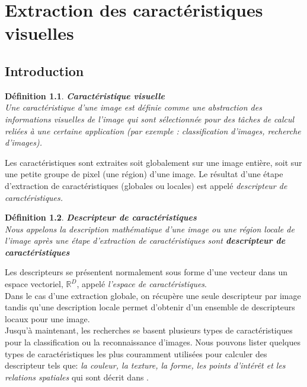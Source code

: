 \chapter[Extraction des caractéristiques]{Extraction des caractéristiques visuelles}
\label{chap:sift}

\section{Introduction}
\newtheorem{mydef}{Définition}
\begin{mydef}
\textbf{Caractéristique visuelle} \\

Une caractéristique d'une image est définie comme une abstraction des informations visuelles de l'image qui sont sélectionnée pour des tâches de calcul reliées à une certaine application (par exemple : classification d'images, recherche d'images).
\end{mydef}

Les caractéristiques sont extraites soit globalement sur une image entière, soit sur une petite groupe de pixel (une région) d'une image. Le résultat d'une étape d'extraction de caractéristiques (globales ou locales) est appelé \textit{descripteur de caractéristiques.}

\begin{mydef}
\textbf{Descripteur de caractéristiques} \\

Nous appelons la description mathématique d'une image ou une région locale de l'image après une étape d'extraction de caractéristiques sont \textbf{descripteur de caractéristiques}
\end{mydef}

Les descripteurs se présentent normalement sous forme d'une vecteur dans un espace vectoriel, $\mathbb{R}^D$, appelé \textit{l'espace de caractéristiques}. \\

Dans le cas d'une extraction globale, on récupère une seule descripteur par image tandis qu'une description locale permet d'obtenir d'un ensemble de descripteurs locaux pour une image. \\

Jusqu'à maintenant, les recherches se basent plusieurs types de caractéristiques pour la classification ou la reconnaissance d'images. Nous pouvons lister quelques types de caractéristiques les plus couramment utilisées pour calculer des descripteur tels que: \textit{la couleur, la texture, la forme, les points d'intérêt et les relations spatiales} qui sont décrit dans \cite{khang09}.\\

